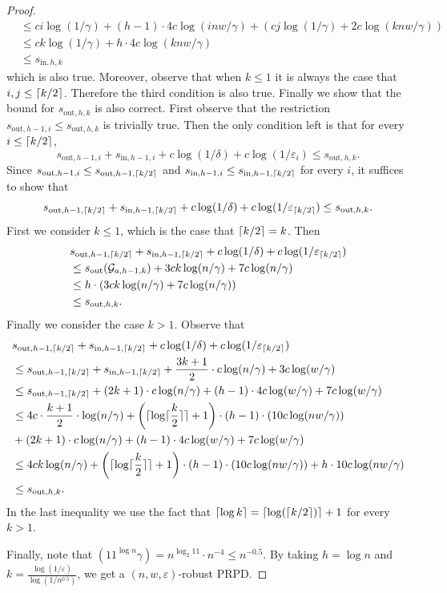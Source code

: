 \documentclass[10pt,a4paper]{article}
\DeclarePairedDelimiter\ceil{\lceil}{\rceil}
\newcommand{\cG}{\mathcal G}
\newcommand{\eps}{\varepsilon}
\newcommand{\sout}[1][]{s_{\mathrm{out}#1}}
\newcommand{\si}[1][]{s_{\mathrm{in}#1}}
\begin{document}
\begin{proof}
\begin{align*}
&\le ci\log(1/\gamma)+(h-1)\cdot 4c\log(inw/\gamma)+(cj\log(1/\gamma)+2c\log(knw/\gamma))\\
&\le ck\log(1/\gamma) +h\cdot 4c\log(knw/\gamma)\\
&\le \si[,h,k]
\end{align*}
which is also true. Moreover, observe that when $k\le 1$ it is always the case that $i,j\le\ceil{k/2}$. Therefore the third condition is also true. Finally we show that the bound for $\sout[,h,k]$ is also correct. First observe that the restriction $\sout[,h-1,i]\le \sout[,h,k]$ is trivially true. Then the only condition left is that for every $i\le\ceil{k/2}$,
$$\sout[,h-1,i]+\si[,h-1,i]+c\log(1/\delta)+c\log(1/\eps_i)\le \sout[,h,k].$$ Since $\sout[,h-1,i]\le \sout[,h-1,\ceil{k/2}]$ and $\si[,h-1,i]\le \si[,h-1,\ceil{k/2}]$ for every $i$, it suffices to show that 
$$\sout[,h-1,\ceil{k/2}]+\si[,h-1,\ceil{k/2}]+c\log(1/\delta)+c\log(1/\eps_{\ceil{k/2}})\le \sout[,h,k].$$
First we consider $k\le 1$, which is the case that $\ceil{k/2}=k$. Then 
\begin{align*}
&\sout[,h-1,\ceil{k/2}]+\si[,h-1,\ceil{k/2}]+c\log(1/\delta)+c\log(1/\eps_{\ceil{k/2}})\\
&\le \sout(\cG_{a,h-1,k}) + 3ck\log(n/\gamma) + 7c\log(n/\gamma)\\
&\le h \cdot (3ck\log(n/\gamma) + 7c\log(n/\gamma)) \\
&\le  \sout[,h,k].
\end{align*}
Finally we consider the case $k>1$. Observe that 
\begin{align*}
&\sout[,h-1,\ceil{k/2}]+\si[,h-1,\ceil{k/2}]+c\log(1/\delta)+c\log(1/\eps_{\ceil{k/2}})\\
&\le \sout[,h-1,\ceil{k/2}]+\si[,h-1,\ceil{k/2}] + \frac{3k+1}{2}\cdot c\log(n/\gamma)+3c\log(w/\gamma)\\
&\le \sout[,h-1,\ceil{k/2}]+ (2k+1)\cdot c\log(n/\gamma) + (h-1)\cdot 4c\log(w/\gamma) + 7c\log(w/\gamma) \\
&\le  4c\cdot\frac{k+1}{2}\cdot\log(n/\gamma) + \left(\ceil{\log \ceil{\frac{k}{2}}}+1\right)\cdot (h-1) \cdot (10c\log(nw/\gamma)) \\
&+ (2k+1)\cdot c\log(n/\gamma) + (h-1)\cdot 4c\log(w/\gamma) + 7c\log(w/\gamma) \\
&\le 4ck\log(n/\gamma) + \left(\ceil{\log \ceil{\frac{k}{2}}}+1\right)\cdot (h-1) \cdot (10c\log(nw/\gamma)) + h\cdot 10c\log(nw/\gamma)  \\
&\le \sout[,h,k].
\end{align*}
In the last inequality we use the fact that $\ceil{\log k}=\ceil{\log(\ceil{k/2})}+1$ for every $k>1$.

Finally, note that $(11^{\log n}\gamma)=n^{\log_2 11}\cdot n^{-4}\le n^{-0.5}$. By taking $h=\log n$ and  $k=\frac{\log(1/\eps)}{\log (1/n^{0.5})}$, we get a $(n,w,\eps)$-robust PRPD.
\end{proof}
\end{document}
